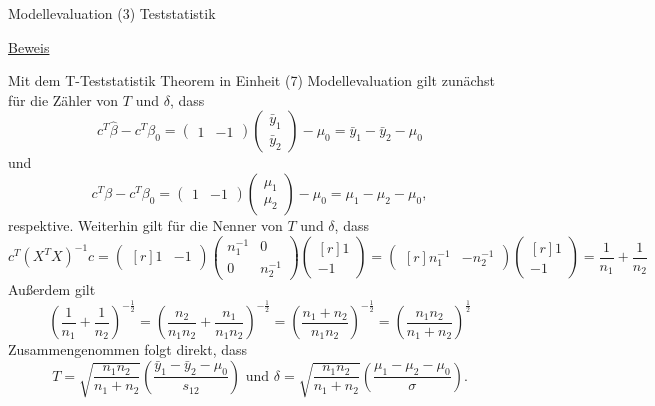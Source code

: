 \documentclass[
  8pt,
  ignorenonframetext,
]{beamer}
\begin{document}
\begin{frame}{Modellevaluation}
\protect\hypertarget{modellevaluation-27}{}
\noindent (3) Teststatistik

\footnotesize

\underline{Beweis}

Mit dem T-Teststatistik Theorem in Einheit (7) Modellevaluation gilt
zunächst für die Zähler von \(T\) und \(\delta\), dass \begin{equation}
c^T\hat{\beta} - c^T\beta_0
= \begin{pmatrix} 1         &  - 1       \end{pmatrix}
  \begin{pmatrix} \bar{y}_1 \\ \bar{y}_2 \end{pmatrix}
  - \mu_0
= \bar{y}_1 - \bar{y}_2 - \mu_0
\end{equation} und \begin{equation}
c^T\beta - c^T\beta_0
= \begin{pmatrix} 1     &  - 1    \end{pmatrix}
  \begin{pmatrix} \mu_1 \\ \mu_2  \end{pmatrix}
  - \mu_0
= \mu_1 - \mu_2 - \mu_0,
\end{equation} respektive. Weiterhin gilt für die Nenner von \(T\) und
\(\delta\), dass \begin{equation}
c^T(X^TX)^{-1}c =
\begin{pmatrix*}[r] 1        & - 1 \end{pmatrix*}
\begin{pmatrix} n_1^{-1} & 0        \\
                0        & n_2^{-1}
\end{pmatrix}
\begin{pmatrix*}[r] 1       \\ - 1 \end{pmatrix*}
=
\begin{pmatrix*}[r] n_1^{-1} &  - n_2^{-1} \end{pmatrix*}
\begin{pmatrix*}[r] 1        \\ - 1 \end{pmatrix*}
= \frac{1}{n_1} + \frac{1}{n_2}
\end{equation} Außerdem gilt \begin{equation}
  \left(\frac{1}{n_1} + \frac{1}{n_2}\right)^{-\frac{1}{2}}
= \left(\frac{n_2}{n_1n_2} + \frac{n_1}{n_1n_2}\right)^{-\frac{1}{2}}
= \left(\frac{n_1 + n_2}{n_1n_2}\right)^{-\frac{1}{2}}
= \left(\frac{n_1n_2}{n_1+n_2}\right)^{\frac{1}{2}}
\end{equation} Zusammengenommen folgt direkt, dass \begin{equation}
T = \sqrt{\frac{n_1n_2}{n_1+n_2}}\left(\frac{\bar{y}_1-\bar{y}_2 - \mu_0}{s_{12}}\right)
\mbox{ und }
\delta = \sqrt{\frac{n_1n_2}{n_1+n_2}}\left(\frac{\mu_1-\mu_2-\mu_0}{\sigma}\right).
\end{equation}
\end{frame}
\end{document}
